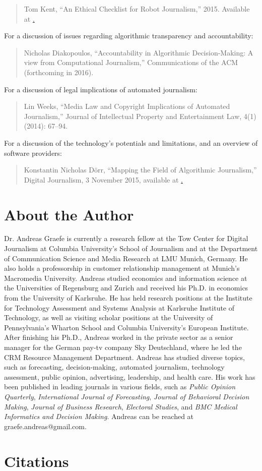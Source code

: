 \documentclass[notoc, symmetric, nobib, nols]{towcenter-guideto-book}
\newcommand{\blankpage}{\newpage\hbox{}\thispagestyle{empty}\newpage}
\begin{document}
\begin{quote}Tom Kent, ``An Ethical Checklist for Robot Journalism,'' 2015. Available at \href{https://medium.com/@tjrkent/an-ethical-checklist-for-robot-journalism-1f41dcbd7be2}.   
\end{quote}
\noindent For a discussion of issues regarding algorithmic transparency and accountability:

\begin{quote}Nicholas Diakopoulos, ``Accountability in Algorithmic Decision-Making: A view from Computational Journalism,'' Communications of the ACM (forthcoming in 2016).   
\end{quote}
\noindent For a discussion of legal implications of automated journalism:

\begin{quote}Lin Weeks, ``Media Law and Copyright Implications of Automated Journalism,'' Journal of Intellectual Property and Entertainment Law, 4(1)(2014): 67--94.
\end{quote}
\noindent For a discussion of the technology's potentials and limitations, and an overview of software providers:

\begin{quote}Konstantin Nicholas Dörr, ``Mapping the Field of Algorithmic Journalism,'' Digital Journalism, 3 November 2015, available at \href{http://www.tandfonline.com/doi/abs/10.1080/21670811.2015.1096748?journalCode=rdij20}.
\end{quote}

\chapter{About the Author}

Dr. Andreas Graefe is currently a research fellow at the Tow Center for Digital Journalism at Columbia University's School of Journalism and at the Department of Communication Science and Media Research at LMU Munich, Germany. He also holds a professorship in customer relationship management at Munich's Macromedia University. Andreas studied economics and information science at the Universities of Regensburg and Zurich and received his Ph.D. in economics from the University of Karlsruhe. He has held research positions at the Institute for Technology Assessment and Systems Analysis at Karlsruhe Institute of Technology, as well as visiting scholar positions at the University of Pennsylvania's Wharton School and Columbia University's European Institute. After finishing his Ph.D., Andreas worked in the private sector as a senior manager for the German pay-tv company Sky Deutschland, where he led the CRM Resource Management Department. Andreas has studied diverse topics, such as forecasting, decision-making, automated journalism, technology assessment, public opinion, advertising, leadership, and health care. His work has been published in leading journals in various fields, such as \textit{Public Opinion Quarterly}, \textit{International Journal of Forecasting}, \textit{Journal of Behavioral Decision Making}, \textit{Journal of Business Research}, \textit{Electoral Studies}, and \textit{BMC Medical Informatics and Decision Making}. Andreas can be reached at graefe.andreas@gmail.com.


\chapter{Citations}
\blankpage
\theendnotes
\end{document}
